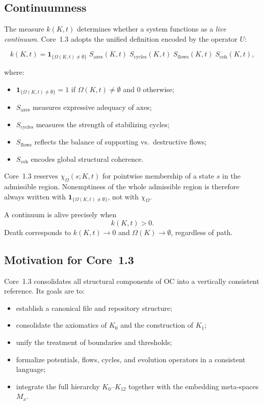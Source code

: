 \subsection{Continuumness}

The measure \(k(K,t)\) determines whether a system functions as a \emph{live continuum}.  
Core~1.3 adopts the unified definition encoded by the operator \(U\):

\[
k(K,t) =
\mathbf{1}_{\{\Omega(K,t)\neq\emptyset\}}\;
S_{\mathrm{axes}}(K,t)\;
S_{\mathrm{cycles}}(K,t)\;
S_{\mathrm{flows}}(K,t)\;
S_{\mathrm{coh}}(K,t),
\]

where:

\begin{itemize}
    \item \(\mathbf{1}_{\{\Omega(K,t)\neq\emptyset\}}=1\) if
          \(\Omega(K,t)\neq\emptyset\) and \(0\) otherwise;
    \item \(S_{\mathrm{axes}}\) measures expressive adequacy of axes;
    \item \(S_{\mathrm{cycles}}\) measures the strength of stabilizing cycles;
    \item \(S_{\mathrm{flows}}\) reflects the balance of supporting vs.\ destructive flows;
    \item \(S_{\mathrm{coh}}\) encodes global structural coherence.
\end{itemize}

Core~1.3 reserves \(\chi_{\Omega}(s;K,t)\) for pointwise membership of a
state \(s\) in the admissible region. Nonemptiness of the whole admissible
region is therefore always written with
\(\mathbf{1}_{\{\Omega(K,t)\neq\emptyset\}}\), not with \(\chi_{\Omega}\).

A continuum is alive precisely when
\[
k(K,t) > 0.
\]
Death corresponds to \(k(K,t)\to 0\) and \(\Omega(K)\to\emptyset\), regardless of path.

\subsection{Motivation for Core~1.3}

Core~1.3 consolidates all structural components of OC into a vertically
consistent reference.
Its goals are to:

\begin{itemize}
    \item establish a canonical file and repository structure;
    \item consolidate the axiomatics of \(K_0\) and the construction of \(K_1\);
    \item unify the treatment of boundaries and thresholds;
    \item formalize potentials, flows, cycles, and evolution operators in a consistent language;
    \item integrate the full hierarchy \(K_0\)–\(K_{12}\) together with the embedding meta-spaces \(M_x\).
\end{itemize}

